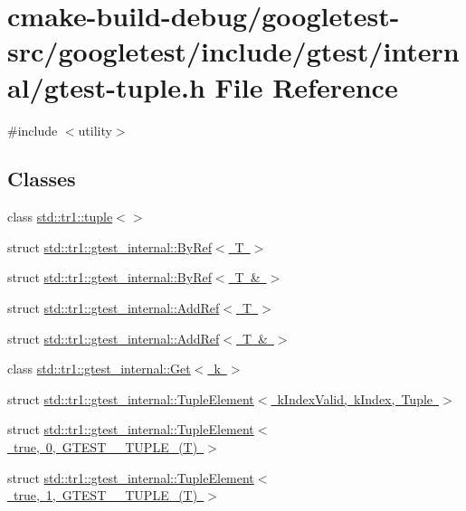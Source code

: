 \hypertarget{gtest-tuple_8h}{}\section{cmake-\/build-\/debug/googletest-\/src/googletest/include/gtest/internal/gtest-\/tuple.h File Reference}
\label{gtest-tuple_8h}
{\ttfamily \#include $<$utility$>$}\newline
\subsection*{Classes}
\begin{DoxyCompactItemize}
\item 
class \mbox{\hyperlink{classstd_1_1tr1_1_1tuple}{std\+::tr1\+::tuple$<$$>$}}
\item 
struct \mbox{\hyperlink{structstd_1_1tr1_1_1gtest__internal_1_1ByRef}{std\+::tr1\+::gtest\+\_\+internal\+::\+By\+Ref$<$ T $>$}}
\item 
struct \mbox{\hyperlink{structstd_1_1tr1_1_1gtest__internal_1_1ByRef_3_01T_01_6_01_4}{std\+::tr1\+::gtest\+\_\+internal\+::\+By\+Ref$<$ T \& $>$}}
\item 
struct \mbox{\hyperlink{structstd_1_1tr1_1_1gtest__internal_1_1AddRef}{std\+::tr1\+::gtest\+\_\+internal\+::\+Add\+Ref$<$ T $>$}}
\item 
struct \mbox{\hyperlink{structstd_1_1tr1_1_1gtest__internal_1_1AddRef_3_01T_01_6_01_4}{std\+::tr1\+::gtest\+\_\+internal\+::\+Add\+Ref$<$ T \& $>$}}
\item 
class \mbox{\hyperlink{classstd_1_1tr1_1_1gtest__internal_1_1Get}{std\+::tr1\+::gtest\+\_\+internal\+::\+Get$<$ k $>$}}
\item 
struct \mbox{\hyperlink{structstd_1_1tr1_1_1gtest__internal_1_1TupleElement}{std\+::tr1\+::gtest\+\_\+internal\+::\+Tuple\+Element$<$ k\+Index\+Valid, k\+Index, Tuple $>$}}
\item 
struct \mbox{\hyperlink{structstd_1_1tr1_1_1gtest__internal_1_1TupleElement_3_01true_00_010_00_01GTEST__10__TUPLE___07T_08_01_4}{std\+::tr1\+::gtest\+\_\+internal\+::\+Tuple\+Element$<$ true, 0, G\+T\+E\+S\+T\+\_\+\_\+\+T\+U\+P\+L\+E\+\_\+(\+T) $>$}}
\item 
struct \mbox{\hyperlink{structstd_1_1tr1_1_1gtest__internal_1_1TupleElement_3_01true_00_011_00_01GTEST__10__TUPLE___07T_08_01_4}{std\+::tr1\+::gtest\+\_\+internal\+::\+Tuple\+Element$<$ true, 1, G\+T\+E\+S\+T\+\_\+\_\+\+T\+U\+P\+L\+E\+\_\+(\+T) $>$}}

\end{DoxyCompactItemize}
